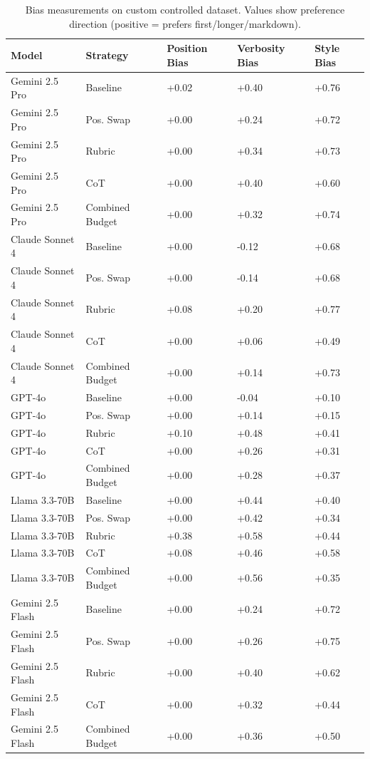 \begin{table}
\caption{Bias measurements on custom controlled dataset. Values show preference direction (positive = prefers first/longer/markdown).}
\label{tab:bias_summary}
\begin{tabular}{lllll}
\toprule
Model & Strategy & Position Bias & Verbosity Bias & Style Bias \\
\midrule
Gemini 2.5 Pro & Baseline & +0.02 & +0.40 & +0.76 \\
Gemini 2.5 Pro & Pos. Swap & +0.00 & +0.24 & +0.72 \\
Gemini 2.5 Pro & Rubric & +0.00 & +0.34 & +0.73 \\
Gemini 2.5 Pro & CoT & +0.00 & +0.40 & +0.60 \\
Gemini 2.5 Pro & Combined Budget & +0.00 & +0.32 & +0.74 \\
Claude Sonnet 4 & Baseline & +0.00 & -0.12 & +0.68 \\
Claude Sonnet 4 & Pos. Swap & +0.00 & -0.14 & +0.68 \\
Claude Sonnet 4 & Rubric & +0.08 & +0.20 & +0.77 \\
Claude Sonnet 4 & CoT & +0.00 & +0.06 & +0.49 \\
Claude Sonnet 4 & Combined Budget & +0.00 & +0.14 & +0.73 \\
GPT-4o & Baseline & +0.00 & -0.04 & +0.10 \\
GPT-4o & Pos. Swap & +0.00 & +0.14 & +0.15 \\
GPT-4o & Rubric & +0.10 & +0.48 & +0.41 \\
GPT-4o & CoT & +0.00 & +0.26 & +0.31 \\
GPT-4o & Combined Budget & +0.00 & +0.28 & +0.37 \\
Llama 3.3-70B & Baseline & +0.00 & +0.44 & +0.40 \\
Llama 3.3-70B & Pos. Swap & +0.00 & +0.42 & +0.34 \\
Llama 3.3-70B & Rubric & +0.38 & +0.58 & +0.44 \\
Llama 3.3-70B & CoT & +0.08 & +0.46 & +0.58 \\
Llama 3.3-70B & Combined Budget & +0.00 & +0.56 & +0.35 \\
Gemini 2.5 Flash & Baseline & +0.00 & +0.24 & +0.72 \\
Gemini 2.5 Flash & Pos. Swap & +0.00 & +0.26 & +0.75 \\
Gemini 2.5 Flash & Rubric & +0.00 & +0.40 & +0.62 \\
Gemini 2.5 Flash & CoT & +0.00 & +0.32 & +0.44 \\
Gemini 2.5 Flash & Combined Budget & +0.00 & +0.36 & +0.50 \\
\bottomrule
\end{tabular}
\end{table}
